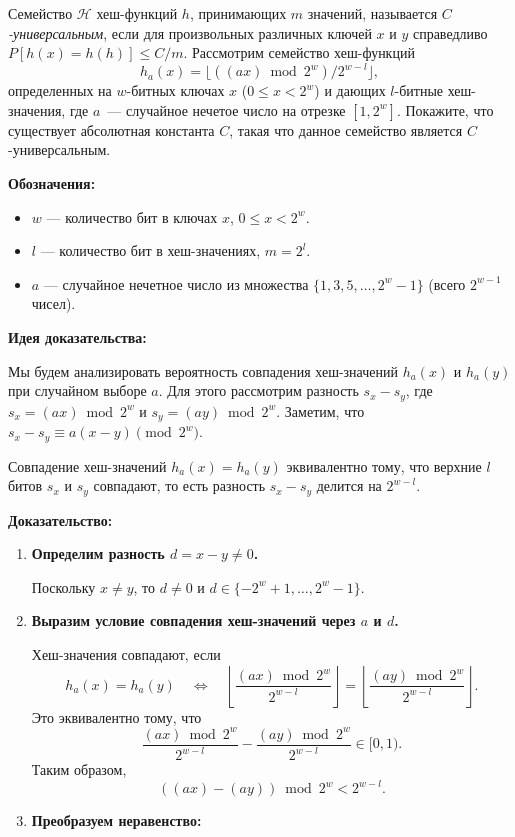 \documentclass[11pt]{article}
\renewcommand{\le}{\leqslant}   %
\begin{document}
\begin{problem}{30}
Семейство $\mathcal{H}$ хеш-функций $h$, принимающих $m$ значений, называется \emph{$C$-универсальным}, если для произвольных различных ключей $x$ и $y$ справедливо $P[h(x)=h(h)] \le C/m$.
Рассмотрим семейство хеш-функций
$$
    h_{a}(x) = \lfloor \left( (ax) \bmod 2^w \right) / 2^{w-l}\rfloor,
$$
определенных на $w$-битных ключах $x$ ($0 \le x < 2^w$) и дающих $l$-битные хеш-значения,
где $a$~--- случайное нечетое число на отрезке $[1,2^w]$.
Покажите, что существует абсолютная константа $C$, такая что данное семейство является $C$-универсальным.
\end{problem}

\begin{solution}
\textbf{Обозначения:}

\begin{itemize}
    \item $w$ — количество бит в ключах $x$, $0 \le x < 2^w$.
    \item $l$ — количество бит в хеш-значениях, $m = 2^l$.
    \item $a$ — случайное нечетное число из множества $\{1, 3, 5, \dots, 2^w - 1\}$ (всего $2^{w - 1}$ чисел).
\end{itemize}

\textbf{Идея доказательства:}

Мы будем анализировать вероятность совпадения хеш-значений $h_{a}(x)$ и $h_{a}(y)$ при случайном выборе $a$. Для этого рассмотрим разность $s_x - s_y$, где $s_x = (a x) \bmod 2^w$ и $s_y = (a y) \bmod 2^w$. Заметим, что $s_x - s_y \equiv a (x - y) \pmod{2^w}$.

Совпадение хеш-значений $h_{a}(x) = h_{a}(y)$ эквивалентно тому, что верхние $l$ битов $s_x$ и $s_y$ совпадают, то есть разность $s_x - s_y$ делится на $2^{w - l}$.

\textbf{Доказательство:}

\begin{enumerate}
    \item \textbf{Определим разность $d = x - y \not= 0$.}

          Поскольку $x \not= y$, то $d \not= 0$ и $d \in \{-2^w + 1, \dots, 2^w - 1\}$.

    \item \textbf{Выразим условие совпадения хеш-значений через $a$ и $d$.}

          Хеш-значения совпадают, если
          \[
              h_{a}(x) = h_{a}(y) \quad \Leftrightarrow \quad \left\lfloor \dfrac{(a x) \bmod 2^w}{2^{w - l}} \right\rfloor = \left\lfloor \dfrac{(a y) \bmod 2^w}{2^{w - l}} \right\rfloor.
          \]
          Это эквивалентно тому, что
          \[
              \dfrac{(a x) \bmod 2^w}{2^{w - l}} - \dfrac{(a y) \bmod 2^w}{2^{w - l}} \in [0,1).
          \]
          Таким образом,
          \[
              ((a x) - (a y)) \bmod 2^w < 2^{w - l}.
          \]
    \item \textbf{Преобразуем неравенство:}


\end{enumerate}
\end{solution}
\end{document}
